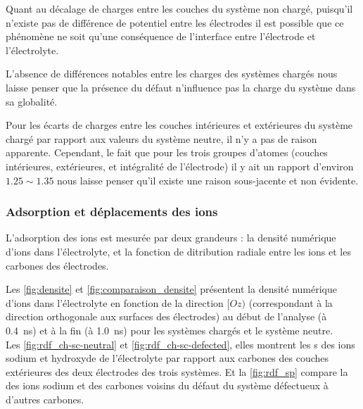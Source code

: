 Quant au décalage de charges entre les couches du système non chargé, puisqu'il n'existe pas de différence de potentiel entre les électrodes il est possible que ce phénomène ne soit qu'une conséquence de l'interface entre l'électrode et l'électrolyte.

L'absence de différences notables entre les charges des systèmes chargés nous laisse penser que la présence du défaut n'influence pas la charge du système dans sa globalité.

Pour les écarts de charges entre les couches intérieures et extérieures du système chargé par rapport aux valeurs du système neutre, il n'y a pas de raison apparente. Cependant, le fait que pour les trois groupes d'atomes (couches intérieures, extérieures, et intégralité de l'électrode) il y ait un rapport d'environ $\num{1.25}\sim \num{1.35}$ nous laisse penser qu'il existe une raison sous-jacente et non évidente.

\clearpage
    \subsubsection{Adsorption et déplacements des ions}

L'adsorption des ions est mesurée par deux grandeurs : la densité numérique d'ions dans l'électrolyte, et la fonction de ditribution radiale entre les ions et les carbones des électrodes.

Les \autoref{fig:densite} et \ref{fig:comparaison_densite} présentent la densité numérique d'ions dans l'électrolyte en fonction de la direction $[Oz)$ (correspondant à la direction orthogonale aux surfaces des électrodes) au début de l'analyse (à \qty{0.4}{\nano \second}) et à la fin (à \qty{1.0}{\nano \second}) pour les systèmes chargés et le système neutre.\\
Les \autoref{fig:rdf_ch-sc-neutral} et \ref{fig:rdf_ch-sc-defected}, elles montrent les \rdf{}s des ions sodium et hydroxyde de l'électrolyte par rapport aux carbones des couches extérieures des deux électrodes des trois systèmes. Et la \autoref{fig:rdf_sp} compare la \rdf{} des ions sodium et des carbones voisins du défaut du système défectueux à d'autres carbones.


